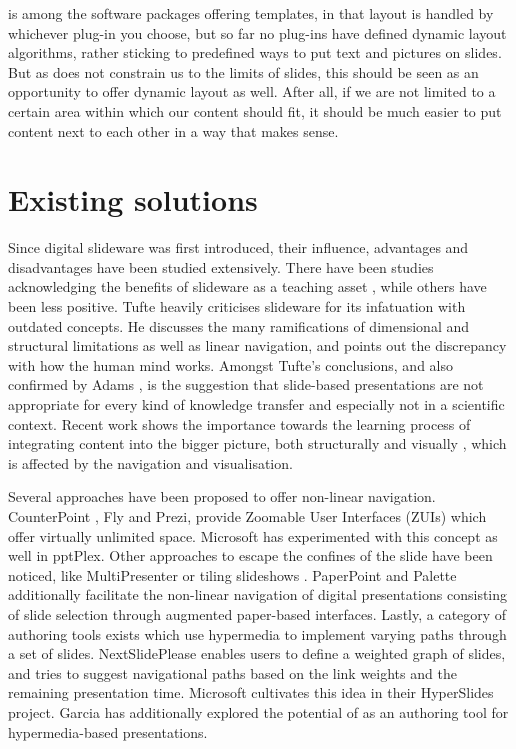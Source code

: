    \mxp is among the software packages offering templates, in that layout is
   handled by whichever plug-in you choose, but so far no plug-ins have defined
   dynamic layout algorithms, rather sticking to predefined ways to put text
   and pictures on slides. But as \mxp does not constrain us to the limits of
   slides, this should be seen as an opportunity to offer dynamic layout as
   well. After all, if we are not limited to a certain area within which our
   content should fit, it should be much easier to put content next to each
   other in a way that makes sense.

  \section{Existing solutions}

   Since digital slideware was first introduced, their influence, advantages
   and disadvantages have been studied extensively. There have been studies
   acknowledging the benefits of slideware as a teaching asset
   \citep{holzinger-1}, while others have been less positive. Tufte
   \citeyearpar{tufte-1} heavily criticises slideware for its infatuation with
   outdated concepts. He discusses the many ramifications of dimensional and
   structural limitations as well as linear navigation, and points out the
   discrepancy with how the human mind works. Amongst Tufte's conclusions, and
   also confirmed by Adams \citep{adams-1}, is the suggestion that slide-based
   presentations are not appropriate for every kind of knowledge transfer and
   especially not in a scientific context. Recent work shows the importance
   towards the learning process of integrating content into the bigger picture,
   both structurally and visually \citep{gross-1}, which is affected by the
   navigation and visualisation.

   Several approaches have been proposed to offer non-linear navigation.
   CounterPoint \citep{good-1}, Fly \citep{lichtschlag-1} and Prezi, provide
   Zoomable User Interfaces (ZUIs) which offer virtually unlimited space.
   Microsoft has experimented with this concept as well in pptPlex. Other
   approaches to escape the confines of the slide have been noticed, like
   MultiPresenter \citep{lanir-1} or tiling slideshows \citep{chen-1}.
   PaperPoint \citep{signer-1} and Palette \citep{nelson-2} additionally
   facilitate the non-linear navigation of digital presentations consisting of
   slide selection through augmented paper-based interfaces. Lastly, a category
   of authoring tools exists which use hypermedia to implement varying paths
   through a set of slides. NextSlidePlease \citep{spicer-1} enables users to
   define a weighted graph of slides, and tries to suggest navigational paths
   based on the link weights and the remaining presentation time. Microsoft
   cultivates this idea in their HyperSlides \citep{edge-1} project. Garcia
   \citep{garcia-1} has additionally explored the potential of \ppt* as an
   authoring tool for hypermedia-based presentations.

